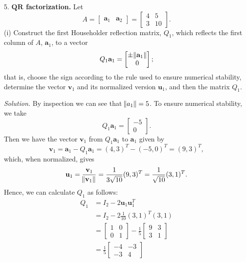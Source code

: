 \documentclass{article}
\def\*#1{\mathbf{#1}}
\begin{document}
\newpage

5. \textbf{$\boldsymbol{QR}$ factorization.}
Let
%
\begin{equation*}
    A =
    \begin{bmatrix}
        \*a_1 & \*a_2
    \end{bmatrix}
    =
   \begin{bmatrix}
       4 & 5 \\
       3 & 10
   \end{bmatrix}
   .
\end{equation*}
%
(i) Construct the first Householder reflection matrix, $Q_1$, which reflects
the first column of $A$, $\*a_1$, to a vector
%
\begin{equation*}
    Q_1 \*a_1 =
    \begin{bmatrix}
        \pm \enVert{\*a_1} \\
        0
    \end{bmatrix}
    ;
\end{equation*}
%
that is, choose the sign according to the rule used to ensure numerical
stability, determine the vector $\*v_1$ and its normalized version
$\*u_1$, and then the matrix $Q_1$.

\textit{Solution.}
By inspection we can see that $\enVert{a_1} = 5$. To ensure numerical stability,
we take
%
\begin{equation*}
    Q_1 \*a_1 =
    \begin{bmatrix}
        -5 \\
        0
    \end{bmatrix}
    .
\end{equation*}
%
Then we have the vector $\*v_1$ from $Q_1\*a_1$ to $\*a_1$ given by 
%
\begin{equation*}
    \*v_1 = \*a_1 - Q_1 \*a_1 = (4, 3)^T - (-5, 0)^T = (9, 3)^T
    ,
\end{equation*}
%
which, when normalized, gives
%
\begin{equation*}
    \*u_1
        = \frac{\*v_1}{\enVert{\*v_1}}
        = \frac{1}{3 \sqrt{10}} (9, 3)^T
        = \frac{1}{\sqrt{10}} (3, 1)^T
    .
\end{equation*}
%
Hence, we can calculate $Q_1$ as follows:
%
\begin{align*}
    Q_1
        &= I_2 - 2 \*u_1 \*u_1^T \\
        &= I_2 - 2 \frac{1}{10} (3, 1)^T (3, 1) \\
        &=
        \begin{bmatrix}
            1 & 0 \\
            0 & 1
        \end{bmatrix}
        - \frac{1}{5}
        \begin{bmatrix}
            9 & 3 \\
            3 & 1
        \end{bmatrix}
        \\
        &=
        \frac{1}{5}
        \begin{bmatrix}
            -4 & -3 \\
            -3 & 4
        \end{bmatrix}
\end{align*}
\end{document}
